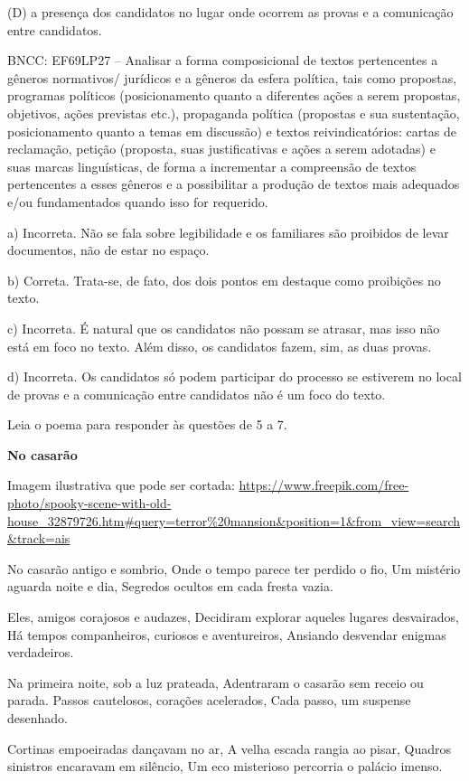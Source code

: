 \begin{itemize}
\begin{itemize}
\begin{escolha}
\begin{escolha}
\begin{escolha}
\begin{escolha}
\begin{escolha}
(D) a presença dos candidatos no lugar onde ocorrem as provas e a
comunicação entre candidatos.

BNCC: EF69LP27 -- Analisar a forma composicional de textos pertencentes
a gêneros normativos/ jurídicos e a gêneros da esfera política, tais
como propostas, programas políticos (posicionamento quanto a diferentes
ações a serem propostas, objetivos, ações previstas etc.), propaganda
política (propostas e sua sustentação, posicionamento quanto a temas em
discussão) e textos reivindicatórios: cartas de reclamação, petição
(proposta, suas justificativas e ações a serem adotadas) e suas marcas
linguísticas, de forma a incrementar a compreensão de textos
pertencentes a esses gêneros e a possibilitar a produção de textos mais
adequados e/ou fundamentados quando isso for requerido.

a) Incorreta. Não se fala sobre legibilidade e os familiares são
proibidos de levar documentos, não de estar no espaço.

b) Correta. Trata-se, de fato, dos dois pontos em destaque como
proibições no texto.

c) Incorreta. É natural que os candidatos não possam se atrasar, mas
isso não está em foco no texto. Além disso, os candidatos fazem, sim, as
duas provas.

d) Incorreta. Os candidatos só podem participar do processo se estiverem
no local de provas e a comunicação entre candidatos não é um foco do
texto.

Leia o poema para responder às questões de 5 a 7.

\textbf{No casarão}

Imagem ilustrativa que pode ser cortada:
\url{https://www.freepik.com/free-photo/spooky-scene-with-old-house_32879726.htm\#query=terror\%20mansion\&position=1\&from_view=search\&track=ais}

No casarão antigo e sombrio, Onde o tempo parece ter perdido o fio, Um
mistério aguarda noite e dia, Segredos ocultos em cada fresta vazia.

Eles, amigos corajosos e audazes, Decidiram explorar aqueles lugares
desvairados, Há tempos companheiros, curiosos e aventureiros, Ansiando
desvendar enigmas verdadeiros.

Na primeira noite, sob a luz prateada, Adentraram o casarão sem receio
ou parada. Passos cautelosos, corações acelerados, Cada passo, um
suspense desenhado.

Cortinas empoeiradas dançavam no ar, A velha escada rangia ao pisar,
Quadros sinistros encaravam em silêncio, Um eco misterioso percorria o
palácio imenso.


\end{escolha}
\end{escolha}
\end{escolha}
\end{escolha}
\end{escolha}
\end{itemize}
\end{itemize}
